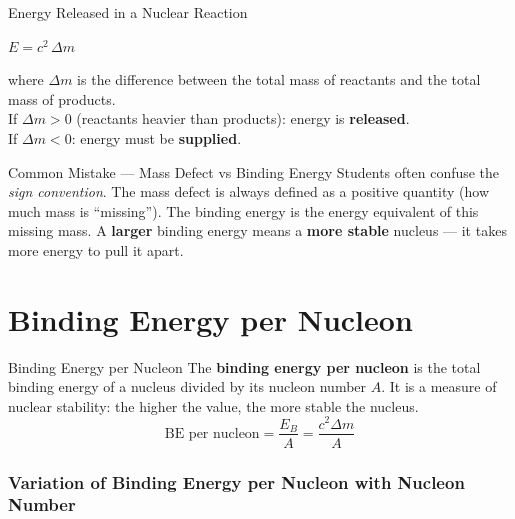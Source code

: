 \begin{formulabox}{Energy Released in a Nuclear Reaction}
\begin{center}
\Large $E = c^2\,\Delta m$
\end{center}
\vspace{0.3em}
where $\Delta m$ is the difference between the total mass of reactants and the total mass of products.\\
If $\Delta m > 0$ (reactants heavier than products): energy is \textbf{released}.\\
If $\Delta m < 0$: energy must be \textbf{supplied}.
\end{formulabox}

\begin{warningbox}{Common Mistake — Mass Defect vs Binding Energy}
Students often confuse the \emph{sign convention}. The mass defect is always defined as a positive quantity (how much mass is ``missing''). The binding energy is the energy equivalent of this missing mass. A \textbf{larger} binding energy means a \textbf{more stable} nucleus — it takes more energy to pull it apart.
\end{warningbox}

\section{Binding Energy per Nucleon}

\begin{definitionbox}{Binding Energy per Nucleon}
The \textbf{binding energy per nucleon} is the total binding energy of a nucleus divided by its nucleon number $A$. It is a measure of nuclear stability: the higher the value, the more stable the nucleus.
$$\text{BE per nucleon} = \frac{E_B}{A} = \frac{c^2 \Delta m}{A}$$
\end{definitionbox}

\subsubsection*{Variation of Binding Energy per Nucleon with Nucleon Number}

